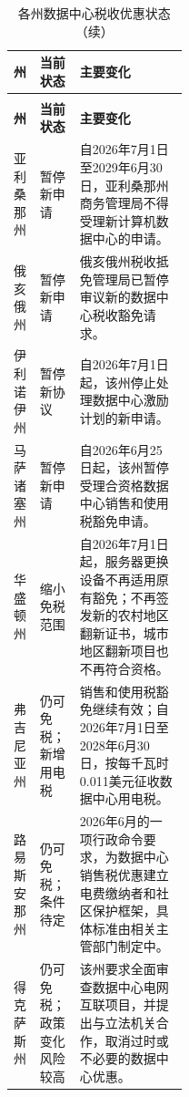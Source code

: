 \begingroup
\ReportTableSetup
\begin{longtable}{|L{0.15\linewidth}|L{0.23\linewidth}|L{\arrayrulewidth\relax}|}
\caption{各州数据中心税收优惠状态}\label{tab:state-incentives}\\
\hline
\textbf{州} & \textbf{当前状态} & \textbf{主要变化} \\ \hline
\endfirsthead
\caption[]{各州数据中心税收优惠状态（续）}\\
\hline
\textbf{州} & \textbf{当前状态} & \textbf{主要变化} \\ \hline
\endhead
亚利桑那州 & 暂停新申请 & 自2026年7月1日至2029年6月30日，亚利桑那州商务管理局不得受理新计算机数据中心的申请。 \\ \hline
俄亥俄州 & 暂停新申请 & 俄亥俄州税收抵免管理局已暂停审议新的数据中心税收豁免请求。 \\ \hline
伊利诺伊州 & 暂停新协议 & 自2026年7月1日起，该州停止处理数据中心激励计划的新申请。 \\ \hline
马萨诸塞州 & 暂停新申请 & 自2026年6月25日起，该州暂停受理合资格数据中心销售和使用税豁免申请。 \\ \hline
华盛顿州 & 缩小免税范围 & 自2026年7月1日起，服务器更换设备不再适用原有豁免；不再签发新的农村地区翻新证书，城市地区翻新项目也不再符合资格。 \\ \hline
弗吉尼亚州 & 仍可免税；新增用电税 & 销售和使用税豁免继续有效；自2026年7月1日至2028年6月30日，按每千瓦时0.011美元征收数据中心用电税。 \\ \hline
路易斯安那州 & 仍可免税；条件待定 & 2026年6月的一项行政命令要求，为数据中心销售税优惠建立电费缴纳者和社区保护框架，具体标准由相关主管部门制定中。 \\ \hline
得克萨斯州 & 仍可免税；政策变化风险较高 & 该州要求全面审查数据中心电网互联项目，并提出与立法机关合作，取消过时或不必要的数据中心优惠。 \\ \hline

\end{longtable}
\endgroup
